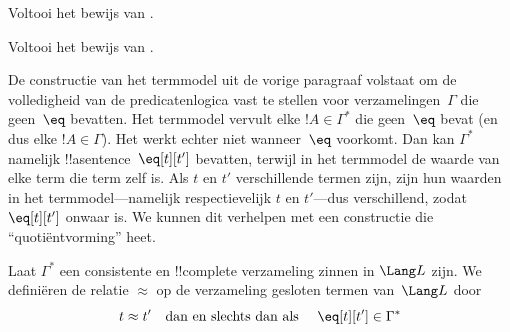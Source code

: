 \documentclass[openany]{memoir}
\begin{document}

\begin{prob}
Voltooi het bewijs van .
\end{prob}

\tagendprob


\begin{prob}
Voltooi het bewijs van .
\end{prob}

\tagendprob
\endgroup

\begingroup
\def\olfilename{OLP-0133}
\def\olfilepath{content/first-order-logic/completeness/}
\hypertarget{unit-OLP-0133}{}




\begin{explain}
De constructie van het termmodel uit de vorige paragraaf volstaat om de
volledigheid van de predicatenlogica vast te stellen voor
verzamelingen~$\Gamma$ die geen~$\eq$ bevatten. Het termmodel vervult
elke $!A \in \Gamma^*$ die geen~$\eq$ bevat (en dus elke
$!A \in \Gamma$). Het werkt echter niet wanneer~$\eq$ voorkomt. Dan kan
$\Gamma^*$ namelijk !!a{sentence}~$\eq[t][t']$ bevatten, terwijl in het
termmodel de waarde van elke term die term zelf is. Als $t$ en $t'$
verschillende termen zijn, zijn hun waarden in het termmodel---namelijk
respectievelijk $t$ en $t'$---dus verschillend, zodat $\eq[t][t']$
onwaar is. We kunnen dit verhelpen met een constructie die
``quotiëntvorming'' heet.
\end{explain}

\begin{defn}
  Laat $\Gamma^*$ een consistente en !!{complete} verzameling zinnen in
  $\Lang L$ zijn. We definiëren de relatie $\approx$ op de verzameling
  gesloten termen van~$\Lang L$ door
  \[
  t \approx t' \text{\quad dan en slechts dan als \quad} \eq[t][t'] \in \Gamma^*
  \]
\end{defn}
\end{document}
